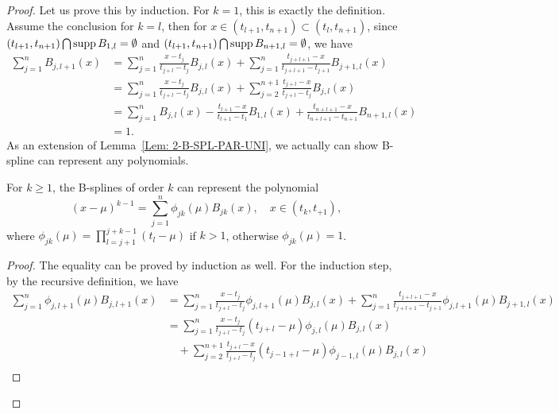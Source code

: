 \begin{proof}
    Let us prove this by induction. For $k=1$, this is exactly the definition. Assume the conclusion for $k = l$, then for $x\in (t_{l+1}, t_{n+1})\subset (t_{l}, t_{n+1})$, since $(t_{l+1}, t_{n+1})\bigcap \operatorname{supp} B_{1, l} = \emptyset$ and $(t_{l+1}, t_{n+1}) \bigcap \operatorname{supp} B_{n+1, l} = \emptyset$, we have 
    \begin{equation}
    \begin{aligned}
        \sum_{j=1}^n B_{j, l+1}(x) &=   \sum_{j=1}^n  \frac{x - t_j}{t_{j+l} - t_j} B_{j, l}(x) +   \sum_{j=1}^n\frac{t_{j+l+1} - x}{t_{j+l+1} - t_{j+1}} B_{j+1, l}(x) \\
        &=  \sum_{j=1}^n  \frac{x - t_j}{t_{j+l} - t_j} B_{j, l}(x) +  \sum_{j=2}^{n+1} \frac{t_{j+l} - x}{t_{j+l} - t_{j}} B_{j, l}(x) \\
        &= \sum_{j = 1}^{n} B_{j, l}(x) - \frac{t_{l+1} - x}{t_{l+1} - t_1} B_{1, l}(x) +  \frac{t_{n+l +1} - x}{t_{n+l + 1} - t_{n+1}} B_{n+1, l}(x) \\
        &=1. 
    \end{aligned}
    \end{equation}
    As an extension of Lemma~\ref{Lem: 2-B-SPL-PAR-UNI}, we actually can show B-spline can represent any polynomials.
    \begin{lemma}[Marsden]
    For $k \ge 1$, the B-splines of order $k$ can represent the polynomial
    \begin{equation}
    \label{EQ: MARSDEN}
        (x - \mu)^{k-1} = \sum_{j=1}^n \phi_{jk}(\mu) B_{jk}(x),\quad x\in (t_{k}, t_{+1}), 
    \end{equation}
    where $\phi_{jk}(\mu) = \prod_{l=j+1}^{j+k-1} (t_{l} - \mu)$ if $k > 1$, otherwise $\phi_{jk}(\mu) = 1$.
    \end{lemma}
    \begin{proof}
    The equality can be proved by induction as well. For the induction step, by the recursive definition, we have
        \begin{equation}\nonumber
        \begin{aligned}
            \sum_{j=1}^n \phi_{j,l+1}(\mu) B_{j, l+1}(x) &= \sum_{j=1}^n  \frac{x - t_j}{t_{j+l} - t_j} \phi_{j,l+1}(\mu) B_{j, l}(x) +   \sum_{j=1}^n\frac{t_{j+l+1} - x}{t_{j+l+1} - t_{j+1}} \phi_{j,l+1}(\mu) B_{j+1, l}(x)\\
            &=  \sum_{j=1}^n  \frac{x - t_j}{t_{j+l} - t_j}(t_{j+l}-\mu) \phi_{j,l}(\mu) B_{j, l}(x) \\&\quad +  \sum_{j=2}^{n+1} \frac{t_{j+l} - x}{t_{j+l} - t_{j}} (t_{j-1+l}-\mu)\phi_{j-1, l}(\mu)  B_{j, l}(x) \\

\end{aligned}
\end{equation}
\end{proof}
\end{proof}
